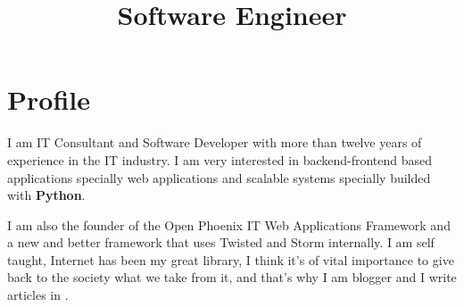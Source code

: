 \documentclass[11pt,a4paper,sans]{moderncv}
\title{Software Engineer}
\begin{document}
\maketitle

\section{Profile}
I am IT Consultant and Software Developer with more than
twelve years of experience in the IT industry. I am very interested in
backend-frontend based applications specially web applications and scalable
systems specially builded with {\bfseries Python}.

I am also the founder of 
the Open Phoenix IT Web Applications Framework and  a new and better framework that uses Twisted and Storm internally. I am self taught, Internet has been my great library, I think it's of
vital importance to give back to the society what we take from it, and that's
why I am blogger and I write articles in .
\end{document}
